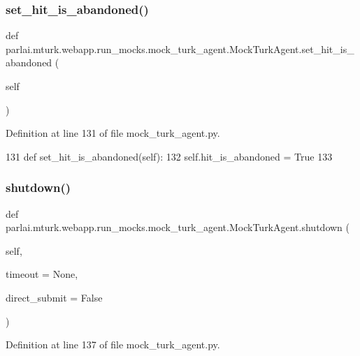 \subsubsection{\texorpdfstring{set\+\_\+hit\+\_\+is\+\_\+abandoned()}{set\_hit\_is\_abandoned()}}
{\footnotesize\ttfamily def parlai.\+mturk.\+webapp.\+run\+\_\+mocks.\+mock\+\_\+turk\+\_\+agent.\+Mock\+Turk\+Agent.\+set\+\_\+hit\+\_\+is\+\_\+abandoned (\begin{DoxyParamCaption}\item[{}]{self }\end{DoxyParamCaption})}



Definition at line 131 of file mock\+\_\+turk\+\_\+agent.\+py.


\begin{DoxyCode}
131     \textcolor{keyword}{def }set\_hit\_is\_abandoned(self):
132         self.hit\_is\_abandoned = \textcolor{keyword}{True}
133 
\end{DoxyCode}
\mbox{\label{classparlai_1_1mturk_1_1webapp_1_1run__mocks_1_1mock__turk__agent_1_1MockTurkAgent_a15babe4006c68790a86ea0ff820e7a60}} 
\subsubsection{\texorpdfstring{shutdown()}{shutdown()}}
{\footnotesize\ttfamily def parlai.\+mturk.\+webapp.\+run\+\_\+mocks.\+mock\+\_\+turk\+\_\+agent.\+Mock\+Turk\+Agent.\+shutdown (\begin{DoxyParamCaption}\item[{}]{self,  }\item[{}]{timeout = {\ttfamily None},  }\item[{}]{direct\+\_\+submit = {\ttfamily False} }\end{DoxyParamCaption})}



Definition at line 137 of file mock\+\_\+turk\+\_\+agent.\+py.



